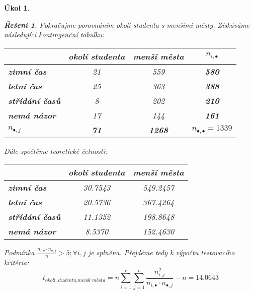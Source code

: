\documentclass[11pt, a4paper]{article}
\theoremstyle{result}
\newtheorem*{result}{Řešení}
\newtheorem{task}{Úkol}
\begin{document}
\begin{task}
\begin{enumerate}[a)]
\begin{result}
             Pokračujme porovnáním \textit{okolí studenta} s \textit{menšími městy}. Získáváme následující kontingenční tabulku:

             \begin{center}
                \begin{tabular}{ |l|c|c|c| }
                    \hline
                    & \textbf{okolí studenta} & \textbf{menší města} & \boldmath$n_{i, \bullet}$ \\
                    \hline
                    \textbf{zimní čas} & 21 & 559 & \textbf{580} \\
                    \hline
                    \textbf{letní čas} & 25 & 363 & \textbf{388} \\
                    \hline
                    \textbf{střídání časů} & 8 & 202 & \textbf{210} \\
                    \hline
                    \textbf{nemá názor} & 17 & 144 & \textbf{161} \\
                    \hline
                    \boldmath$n_{\bullet, j}$ & \textbf{71} & \textbf{1268} & \boldmath$n_{\bullet, \bullet} = 1339$ \\
                    \hline
                \end{tabular}
            \end{center}

            Dále spočtěme teoretické četnosti:

            \begin{center}
                \begin{tabular}{ |l|c|c| }
                    \hline
                    & \textbf{okolí studenta} & \textbf{menší města} \\
                    \hline
                    \textbf{zimní čas} & 30.7543 & 549.2457 \\
                    \hline
                    \textbf{letní čas} & 20.5736 & 367.4264 \\
                    \hline
                    \textbf{střídání časů} & 11.1352 & 198.8648 \\
                    \hline
                    \textbf{nemá názor} & 8.5370 & 152.4630 \\
                    \hline
                \end{tabular}
            \end{center}

            Podmínka $\frac{n_{i, \bullet} \cdot n_{\bullet, j}}{n} > 5; \forall i,j$ je splněna. Přejděme tedy k výpočtu testovacího kritéria:
            $$t_{\textit{okolí studenta}, \textit{menší města}} = n \sum_{i=1}^{r} \sum_{j=1}^{c} \frac{n_{i, j}^2}{n_{i, \bullet} \cdot n_{\bullet, j}} - n = 14.0643$$


\end{result}
\end{enumerate}
\end{task}
\end{document}

